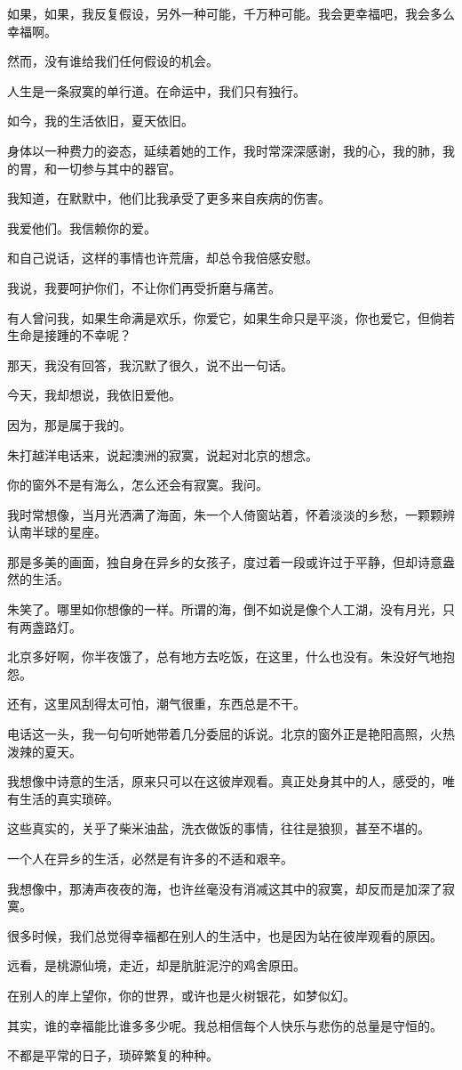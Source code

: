 \documentclass[12pt,a4paper]{article}
\begin{document}
		如果，如果，我反复假设，另外一种可能，千万种可能。我会更幸福吧，我会多么幸福啊。\par
		然而，没有谁给我们任何假设的机会。

		人生是一条寂寞的单行道。在命运中，我们只有独行。

		如今，我的生活依旧，夏天依旧。

		身体以一种费力的姿态，延续着她的工作，我时常深深感谢，我的心，我的肺，我的胃，和一切参与其中的器官。\par
		我知道，在默默中，他们比我承受了更多来自疾病的伤害。\par
		我爱他们。我信赖你的爱。\par
		和自己说话，这样的事情也许荒唐，却总令我倍感安慰。\par
		我说，我要呵护你们，不让你们再受折磨与痛苦。

		有人曾问我，如果生命满是欢乐，你爱它，如果生命只是平淡，你也爱它，但倘若生命是接踵的不幸呢？\par
		那天，我没有回答，我沉默了很久，说不出一句话。\par
		今天，我却想说，我依旧爱他。

		因为，那是属于我的。

	\endwriting



		朱打越洋电话来，说起澳洲的寂寞，说起对北京的想念。\par
		你的窗外不是有海么，怎么还会有寂寞。我问。\par
		我时常想像，当月光洒满了海面，朱一个人倚窗站着，怀着淡淡的乡愁，一颗颗辨认南半球的星座。\par
		那是多美的画面，独自身在异乡的女孩子，度过着一段或许过于平静，但却诗意盎然的生活。\par
		朱笑了。哪里如你想像的一样。所谓的海，倒不如说是像个人工湖，没有月光，只有两盏路灯。\par
		北京多好啊，你半夜饿了，总有地方去吃饭，在这里，什么也没有。朱没好气地抱怨。\par
		还有，这里风刮得太可怕，潮气很重，东西总是不干。\par
		电话这一头，我一句句听她带着几分委屈的诉说。北京的窗外正是艳阳高照，火热泼辣的夏天。\par
		我想像中诗意的生活，原来只可以在这彼岸观看。真正处身其中的人，感受的，唯有生活的真实琐碎。\par
		这些真实的，关乎了柴米油盐，洗衣做饭的事情，往往是狼狈，甚至不堪的。\par
		一个人在异乡的生活，必然是有许多的不适和艰辛。\par
		我想像中，那涛声夜夜的海，也许丝毫没有消减这其中的寂寞，却反而是加深了寂寞。\par
		很多时候，我们总觉得幸福都在别人的生活中，也是因为站在彼岸观看的原因。\par
		远看，是桃源仙境，走近，却是肮脏泥泞的鸡舍原田。\par
		在别人的岸上望你，你的世界，或许也是火树银花，如梦似幻。\par
		其实，谁的幸福能比谁多多少呢。我总相信每个人快乐与悲伤的总量是守恒的。\par
		不都是平常的日子，琐碎繁复的种种。
\end{document}
